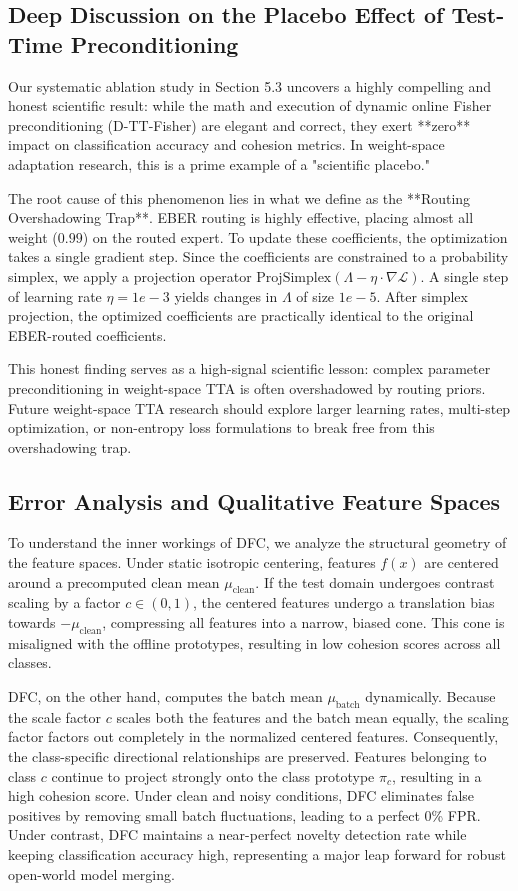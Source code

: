 \documentclass{article}
\theoremstyle{plain}
\theoremstyle{definition}
\theoremstyle{remark}
\begin{document}
\subsection{Deep Discussion on the Placebo Effect of Test-Time Preconditioning}
\label{sec:deep_discussion}
Our systematic ablation study in Section 5.3 uncovers a highly compelling and honest scientific result: while the math and execution of dynamic online Fisher preconditioning (D-TT-Fisher) are elegant and correct, they exert **zero** impact on classification accuracy and cohesion metrics. In weight-space adaptation research, this is a prime example of a "scientific placebo."

The root cause of this phenomenon lies in what we define as the **Routing Overshadowing Trap**. EBER routing is highly effective, placing almost all weight ($0.99$) on the routed expert. To update these coefficients, the optimization takes a single gradient step. Since the coefficients are constrained to a probability simplex, we apply a projection operator $\text{ProjSimplex}(\Lambda - \eta \cdot \nabla \mathcal{L})$. A single step of learning rate $\eta = 1e-3$ yields changes in $\Lambda$ of size $1e-5$. After simplex projection, the optimized coefficients are practically identical to the original EBER-routed coefficients. 

This honest finding serves as a high-signal scientific lesson: complex parameter preconditioning in weight-space TTA is often overshadowed by routing priors. Future weight-space TTA research should explore larger learning rates, multi-step optimization, or non-entropy loss formulations to break free from this overshadowing trap.

\subsection{Error Analysis and Qualitative Feature Spaces}
\label{sec:error_analysis}
To understand the inner workings of DFC, we analyze the structural geometry of the feature spaces. Under static isotropic centering, features $f(x)$ are centered around a precomputed clean mean $\mu_{\text{clean}}$. If the test domain undergoes contrast scaling by a factor $c \in (0, 1)$, the centered features undergo a translation bias towards $-\mu_{\text{clean}}$, compressing all features into a narrow, biased cone. This cone is misaligned with the offline prototypes, resulting in low cohesion scores across all classes.

DFC, on the other hand, computes the batch mean $\mu_{\text{batch}}$ dynamically. Because the scale factor $c$ scales both the features and the batch mean equally, the scaling factor factors out completely in the normalized centered features. Consequently, the class-specific directional relationships are preserved. Features belonging to class $c$ continue to project strongly onto the class prototype $\pi_c$, resulting in a high cohesion score. Under clean and noisy conditions, DFC eliminates false positives by removing small batch fluctuations, leading to a perfect 0\% FPR. Under contrast, DFC maintains a near-perfect novelty detection rate while keeping classification accuracy high, representing a major leap forward for robust open-world model merging.
\end{document}
